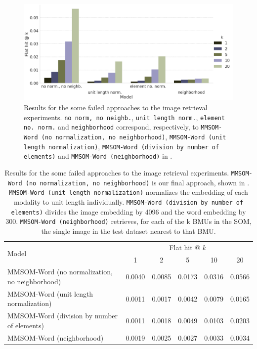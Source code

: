 \documentclass[a4paper]{standalone}
\begin{document}
\begin{figure}[h]
    \centering
    \includegraphics[width=\textwidth]{images/image_retrieval_fail_results.png}
    \caption{Results for the some failed approaches to the image retrieval experiments. \texttt{no norm, no neighb.}, \texttt{unit length norm.}, \texttt{element no. norm.} and \texttt{neighborhood} correspond, respectively, to \texttt{MMSOM-Word (no normalization, no neighborhood)}, \texttt{MMSOM-Word (unit length normalization)}, \texttt{MMSOM-Word (division by number of elements)} and \texttt{MMSOM-Word (neighborhood)} in .}
    \label{fig:ImageRetrievalFailed}
\end{figure}

\begin{table}[h]
    \begin{footnotesize}
        \begin{tabularx}{\textwidth}{|X|c|c|c|c|c|}
            \hline
            \multirow{2}{*}{Model}                         & \multicolumn{5}{c|}{Flat hit @ $k$}        \\
            \cline{2-6}                                    & 1      & 2      & 5      & 10     & 20     \\ 
            \hline
            MMSOM-Word (no normalization, no neighborhood) & 0.0040 & 0.0085 & 0.0173 & 0.0316 & 0.0566 \\ 
            \hline
            MMSOM-Word (unit length normalization)         & 0.0011 & 0.0017 & 0.0042 & 0.0079 & 0.0165 \\ 
            \hline
            MMSOM-Word (division by number of elements)    & 0.0011 & 0.0018 & 0.0049 & 0.0103 & 0.0203 \\ 
            \hline
            MMSOM-Word (neighborhood)                      & 0.0019 & 0.0025 & 0.0027 & 0.0033 & 0.0034 \\ 
            \hline
        \end{tabularx}
    \end{footnotesize}
    \caption{Results for the some failed approaches to the image retrieval experiments. \texttt{MMSOM-Word (no normalization, no neighborhood)} is our final approach, shown in . \texttt{MMSOM-Word (unit length normalization)} normalizes the embedding of each modality to unit length individually. \texttt{MMSOM-Word (division by number of elements)} divides the image embedding by 4096 and the word embedding by 300. \texttt{MMSOM-Word (neighborhood)} retrieves, for each of the k BMUs in the SOM, the single image in the test dataset nearest to that BMU.}
    \label{tab:ImageRetrievalFailed}
\end{table}
\end{document}
